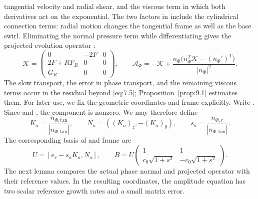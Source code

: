 tangential velocity and radial shear, and the viscous term in which both derivatives act on the
exponential. The two factors  in  include the cylindrical connection terms: radial motion
changes the tangential frame as well as the base swirl. Eliminating the normal pressure term
while differentiating  gives the projected evolution operator :
\begin{equation}
\mathcal K=
\begin{pmatrix}
0&-2F&0\\
2F+RF_R&0&0\\
G_R&0&0
\end{pmatrix},
\qquad
\mathcal A_\Phi=-\mathcal K+
\frac{n_\Phi\bigl(n_\Phi^T\mathcal K-(n_\Phi')^T\bigr)}{|n_\Phi|^2}.
\tag{7.6}\label{eq:7.6}
\end{equation}
The slow transport, the error in phase transport, and the remaining viscous terms occur in
the residual beyond \eqref{eq:7.5}; Proposition~\ref{prop:9.1} estimates them. For later use, we fix the geometric
coordinates and frame explicitly. Write . Since  and ,
the component  is nonzero. We may therefore define
\begin{equation}
K_a=\frac{n_{\Phi,\mathrm{tan}}}{|n_{\Phi,\mathrm{tan}}|},\qquad
N_a=((K_a)_z,-(K_a)_\theta),\qquad
s_a=\frac{n_{\Phi,r}}{|n_{\Phi,\mathrm{tan}}|}.
\tag{7.7}\label{eq:7.7}
\end{equation}
The corresponding basis of  and frame are
\begin{equation}
U=[e_r-s_aK_a,N_a],\qquad
B=U
\begin{pmatrix}
1&1\\
c_0\sqrt{1+s^2}&-c_0\sqrt{1+s^2}
\end{pmatrix}.
\tag{7.8}\label{eq:7.8}
\end{equation}
The next lemma compares the actual phase normal and projected operator with their
reference values. In the resulting coordinates, the amplitude equation has two scalar reference
growth rates and a small matrix error.

